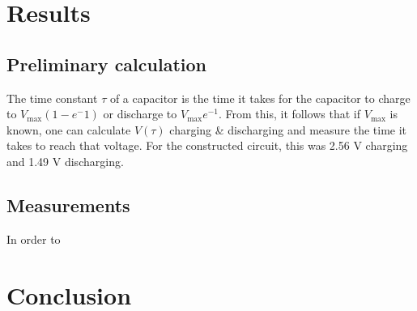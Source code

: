 \documentclass{article}
\begin{document}
\section{Results}
    \subsection{Preliminary calculation}
        The time constant $\tau$ of a capacitor is the time it takes for the capacitor to charge to $V_\mathrm{max}(1-e^-1)$ or discharge to $V_\mathrm{max}e^{-1}$. From this, it follows that if $V_\mathrm{max}$ is known, one can calculate $V(\tau)$ charging \& discharging and measure the time it takes to reach that voltage.
        For the constructed circuit, this was 2.56 V charging and 1.49 V discharging.
    
    \subsection{Measurements}
        In order to 

    \begin{table}[h]
        \centering
    \end{table}

\section{Conclusion}
\end{document}
